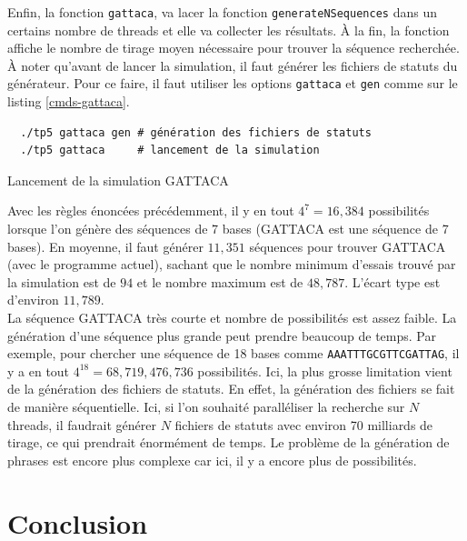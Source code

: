 \documentclass[a4paper]{article}
\begin{document}
Enfin, la fonction \texttt{gattaca}, va lacer la fonction
\texttt{generateNSequences} dans un certains nombre de threads et elle va
collecter les résultats. À la fin, la fonction affiche le nombre de tirage moyen
nécessaire pour trouver la séquence recherchée.\\

À noter qu'avant de lancer la simulation, il faut générer les fichiers de
statuts du générateur. Pour ce faire, il faut utiliser les options
\texttt{gattaca} et \texttt{gen} comme sur le listing \ref{cmds-gattaca}.

\begin{listing}[ht!]
\begin{verbatim}
  ./tp5 gattaca gen # génération des fichiers de statuts
  ./tp5 gattaca     # lancement de la simulation
\end{verbatim}
\caption{Lancement de la simulation GATTACA}
\label{cmds-gattaca}
\end{listing}

Avec les règles énoncées précédemment, il y en tout $4^7 = 16,384$ possibilités
lorsque l'on génère des séquences de 7 bases (GATTACA est une séquence de 7
bases). En moyenne, il faut générer $11,351$ séquences pour trouver GATTACA (avec
le programme actuel), sachant que le nombre minimum d'essais trouvé par la
simulation est de $94$ et le nombre maximum est de $48,787$. L'écart type est
d'environ $11,789$.\\

La séquence GATTACA très courte et nombre de possibilités est assez faible. La
génération d'une séquence plus grande peut prendre beaucoup de temps. Par
exemple, pour chercher une séquence de 18 bases comme
\texttt{AAATTTGCGTTCGATTAG}, il y a en tout $4^{18} = 68,719,476,736$
possibilités. Ici, la plus grosse limitation vient de la génération des fichiers
de statuts. En effet, la génération des fichiers se fait de manière
séquentielle. Ici, si l'on souhaité paralléliser la recherche sur $N$ threads,
il faudrait générer $N$ fichiers de statuts avec environ 70 milliards de tirage,
ce qui prendrait énormément de temps. Le problème de la génération de phrases
est encore plus complexe car ici, il y a encore plus de possibilités.

\clearpage
\section{Conclusion}
\end{document}
